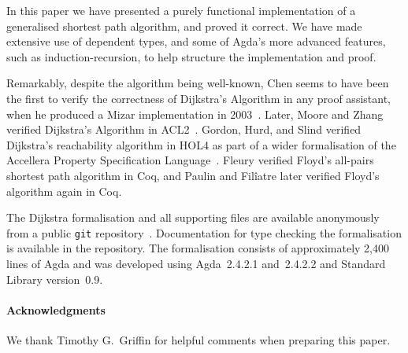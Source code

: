 In this paper we have presented a purely functional implementation of a generalised shortest path algorithm, and proved it correct.
We have made extensive use of dependent types, and some of Agda's more advanced features, such as induction-recursion, to help structure the implementation and proof.

Remarkably, despite the algorithm being well-known, Chen seems to have been the first to verify the correctness of Dijkstra's Algorithm in any proof assistant, when he produced a Mizar implementation in 2003~\cite{chen:dijkstra:2003}.
Later, Moore and Zhang verified Dijkstra's Algorithm in ACL2~\cite{moore:proof-pearl:2005}.
Gordon, Hurd, and Slind verified Dijkstra's reachability algorithm in HOL4 as part of a wider formalisation of the Accellera Property Specification Language~\cite{gordon:executing:2003}.
Fleury verified Floyd's all-pairs shortest path algorithm in Coq, and Paulin and Fil\^iatre later verified Floyd's algorithm again in Coq.

The Dijkstra formalisation and all supporting files are available anonymously from a public \texttt{git} repository~\cite{markert_formalised_2015}.
Documentation for type checking the formalisation is available in the repository.
The formalisation consists of approximately 2,400 lines of Agda and was developed using Agda~2.4.2.1 and~2.4.2.2 and Standard Library version~0.9.

\paragraph{Acknowledgments}
We thank Timothy G.~Griffin for helpful comments when preparing this paper.
